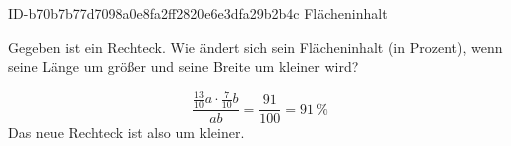 \begin{exercise}
      {ID-b70b7b77d7098a0e8fa2ff2820e6e3dfa29b2b4c}
      {Flächeninhalt}
  \ifproblem\problem\par
    Gegeben ist ein Rechteck. Wie ändert sich sein Flächeninhalt (in Prozent),
    wenn seine Länge um  größer und seine Breite um  kleiner wird?
  \fi
  \ifoutcome\outcome\par
    \begin{equation*}
      \frac{\frac{13}{10}a\cdot\frac{7}{10}b}{ab}
      =\frac{91}{100}=91\,\text{\%}
    \end{equation*}
    Das neue Rechteck ist also um  kleiner.
  \fi
\end{exercise}
